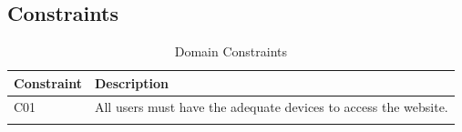 \subsection{Constraints}
\label{sub:constraints}%

\begin{longtable}{|l|p{}|}
      \hline
      \textbf{Constraint} & \textbf{Description}                                            \\
      \hline
      C01                 & All users must have the adequate devices to access the website. \\
      \hline

      \caption{Domain Constraints}
      \label{tab:domain_constraints}
\end{longtable}
